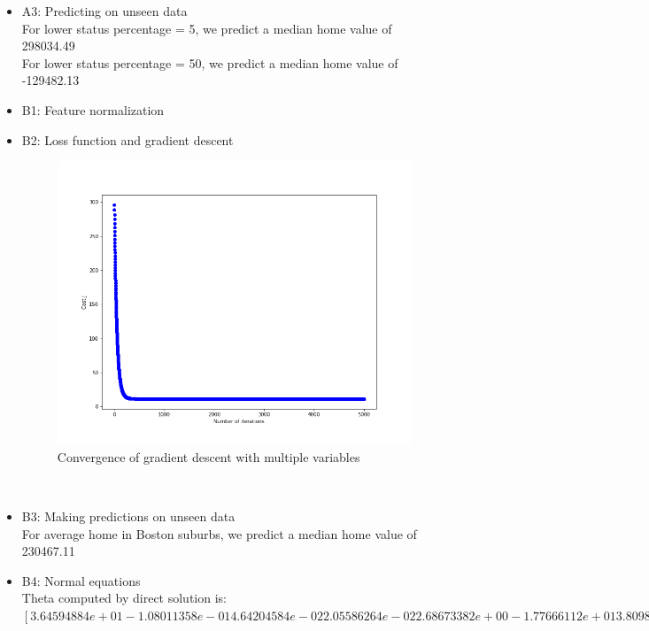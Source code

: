 \documentclass{article}
\begin{document}
\begin{itemize}
\begin{figure}[h!]
	\caption{Convergence of gradient descent}
\end{figure}
    \item A3: Predicting on unseen data\\
    For lower status percentage = 5, we predict a median home value of 298034.49\\
For lower status percentage = 50, we predict a median home value of -129482.13\\
\item B1: Feature normalization\\
\item B2: Loss function and gradient descent\\
\begin{figure}[h!]
	\centering
	\includegraphics[scale = 0.3]{multi_gradient_descent.png}
	\caption{Convergence of gradient descent with multiple variables}
\end{figure}\\
\item B3: Making predictions on unseen data\\
For average home in Boston suburbs, we predict a median home value of 230467.11\\
\item B4: Normal equations\\
Theta computed by direct solution is: $[ 3.64594884e+01 -1.08011358e-01  4.64204584e-02  2.05586264e-02
  2.68673382e+00 -1.77666112e+01  3.80986521e+00  6.92224640e-04
 -1.47556685e+00  3.06049479e-01 -1.23345939e-02 -9.52747232e-01
  9.31168327e-03 -5.24758378e-01]$\\

\end{itemize}
\end{document}
